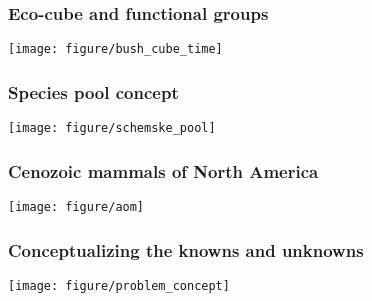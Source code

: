 \documentclass{beamer}
\begin{document}
\begin{frame}
  \frametitle{Eco-cube and functional groups}

  \begin{center}
    \texttt{[image: figure/bush\_cube\_time]}
  \end{center}

  \tiny{}
\end{frame}

\begin{frame}
  \frametitle{Species pool concept}

  \begin{center}
    \texttt{[image: figure/schemske\_pool]}
  \end{center}

  \tiny{}
\end{frame}

\begin{frame}
  \frametitle{Cenozoic mammals of North America}
  \begin{center}
    \texttt{[image: figure/aom]}
  \end{center}

  \tiny{}
\end{frame}

\begin{frame}
  \frametitle{Conceptualizing the knowns and unknowns}
  \begin{center}
    \texttt{[image: figure/problem\_concept]}
  \end{center}
\end{frame}
\end{document}
